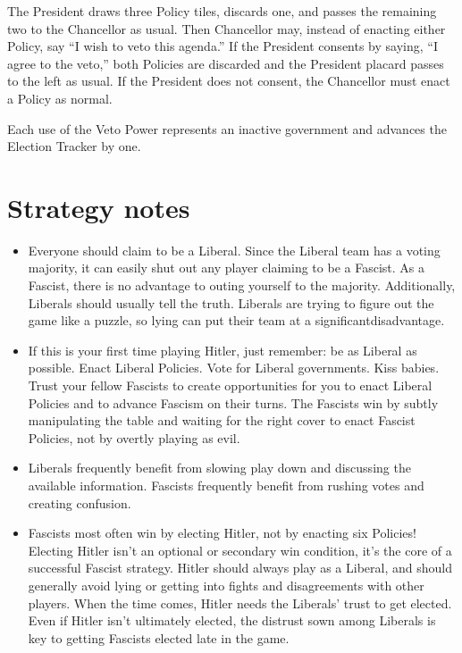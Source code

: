 \documentclass[13pt,a4paper,twocolumn,titlepage]{scrartcl}
\begin{document}
	The President draws three Policy tiles, discards one, and passes the remaining two to the Chancellor as usual. Then Chancellor may, instead of enacting either Policy, say “I wish to veto this agenda.” If the President consents	by saying, “I agree to the veto,” both Policies are discarded and the President placard passes to the left as usual. If the President does not consent, the Chancellor must enact a Policy as normal.
	
	Each use of the Veto Power represents an inactive government and advances the Election Tracker by one.
	
	\section*{Strategy notes}
	\begin{itemize}
		\item \textcolor{Blue3}{Everyone should claim to be a \textcolor{liberal}{Liberal}.} Since the \textcolor{liberal}{Liberal} team has a voting majority, it can easily shut out any player claiming to be a \textcolor{fascist}{Fascist}. As a \textcolor{fascist}{Fascist}, there is no advantage to outing yourself to the majority. Additionally, \textcolor{liberal}{Liberals} should usually tell the truth. \textcolor{liberal}{Liberals} are trying to figure out the game like a puzzle, so lying can put their team at a significant ​disadvantage.
		
		\item \textcolor{Blue3}{If this is your first time playing \textcolor{fascist}{Hitler}, just remember: be as \textcolor{liberal}{Liberal} as possible.} Enact \textcolor{liberal}{Liberal} Policies. Vote for \textcolor{liberal}{Liberal} governments. Kiss babies. Trust your fellow \textcolor{fascist}{Fascists} to create opportunities for you to enact \textcolor{liberal}{Liberal} Policies and to advance \textcolor{fascist}{Fascism} on their turns. The \textcolor{fascist}{Fascists} win by subtly manipulating the table and waiting for the right cover to enact \textcolor{fascist}{Fascist} Policies, not by overtly playing as evil.
		
		\item \textcolor{Blue3}{\textcolor{liberal}{Liberals} frequently benefit from slowing play down and discussing the available information.} \textcolor{fascist}{Fascists} frequently benefit from rushing votes and creating confusion.
		
		\item \textcolor{Blue3}{\textcolor{fascist}{Fascists} most often win by electing \textcolor{fascist}{Hitler}, not by enacting six Policies!} Electing \textcolor{fascist}{Hitler} isn’t an optional or secondary win condition, it’s the core of a successful \textcolor{fascist}{Fascist} strategy. \textcolor{fascist}{Hitler} should always play as a \textcolor{liberal}{Liberal}, and should generally avoid lying or getting into fights and disagreements with other players. When the time comes, \textcolor{fascist}{Hitler} needs the \textcolor{liberal}{Liberals}’ trust to get elected. Even if \textcolor{fascist}{Hitler} isn’t ultimately elected, the distrust sown among \textcolor{liberal}{Liberals} is key to getting \textcolor{fascist}{Fascists} elected late in the game.
		

\end{itemize}
\end{document}

